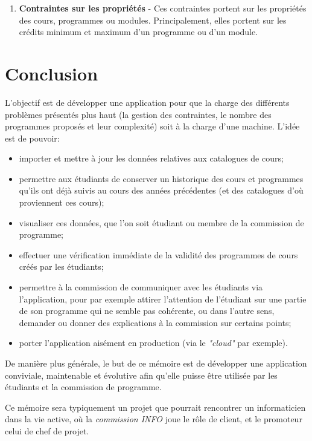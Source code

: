 \begin{enumerate}
\item \textbf{Contraintes sur les propriétés} - Ces contraintes portent sur les propriétés des cours, programmes ou modules. Principalement, elles portent sur les crédits minimum et maximum d'un programme ou d'un module.

\end{enumerate}


\section{Conclusion}
L'objectif est de développer une application pour que la charge des différents problèmes présentés plus haut (la gestion des contraintes, le nombre des programmes proposés et leur complexité) soit à la charge d'une machine. L'idée est de pouvoir:
\begin{itemize}
\item importer et mettre à jour les données relatives aux catalogues de cours;
\item permettre aux étudiants de conserver un historique des cours et programmes qu'ils ont déjà suivis au cours des années précédentes (et des catalogues d'où proviennent ces cours);
\item visualiser ces données, que l'on soit étudiant ou membre de la commission de programme;
\item effectuer une vérification immédiate de la validité des programmes de cours créés par les étudiants;


\item permettre à la commission de communiquer avec les étudiants via l'application, pour par exemple attirer l'attention de l'étudiant sur une partie de son programme qui ne semble pas cohérente, ou dans l'autre sens, demander ou donner des explications à la commission sur certains points;
\item porter l'application aisément en production (via le \textit{"cloud"} par exemple). 
\end{itemize}

De manière plus générale, le but de ce mémoire est de développer une application conviviale, maintenable et évolutive afin qu'elle puisse être utilisée par les étudiants et la commission de programme. 

Ce mémoire sera typiquement un projet que pourrait rencontrer un informaticien dans la vie active, où la \textit{commission INFO} joue le rôle de client, et le promoteur celui de chef de projet. 